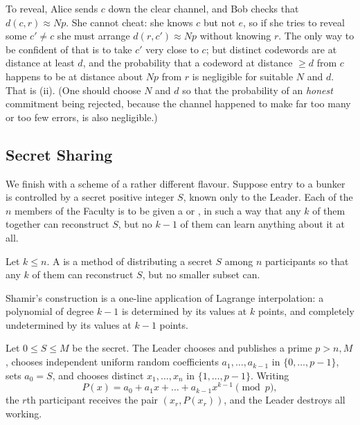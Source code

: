 To reveal, Alice sends $c$ down the clear channel, and Bob checks that $d(c,r)\approx Np$. She cannot cheat: she knows $c$ but not $e$, so if she tries to reveal some $c'\ne c$ she must arrange $d(r,c')\approx Np$ without knowing $r$. The only way to be confident of that is to take $c'$ very close to $c$; but distinct codewords are at distance at least $d$, and the probability that a codeword at distance $\ge d$ from $c$ happens to be at distance about $Np$ from $r$ is negligible for suitable $N$ and $d$. That is (ii). (One should choose $N$ and $d$ so that the probability of an \emph{honest} commitment being rejected, because the channel happened to make far too many or too few errors, is also negligible.)

\subsection{Secret Sharing}

We finish with a scheme of a rather different flavour. Suppose entry to a bunker is controlled by a secret positive integer $S$, known only to the Leader. Each of the $n$ members of the Faculty is to be given a  or , in such a way that any $k$ of them together can reconstruct $S$, but no $k-1$ of them can learn anything about it at all.

\begin{definition}
	Let $k \le n$. A  is a method of distributing a secret $S$ among $n$ participants so that any $k$ of them can reconstruct $S$, but no smaller subset can.
\end{definition}

Shamir's construction is a one-line application of Lagrange interpolation: a polynomial of degree $k-1$ is determined by its values at $k$ points, and completely undetermined by its values at $k-1$ points.

Let $0 \le S \le M$ be the secret. The Leader chooses and publishes a prime $p > n, M$, chooses independent uniform random coefficients $a_1,\dots,a_{k-1}$ in $\{0,\dots,p-1\}$, sets $a_0 = S$, and chooses distinct $x_1,\dots,x_n$ in $\{1,\dots,p-1\}$. Writing
$$P(x) = a_0+a_1x+\dots+a_{k-1}x^{k-1} \pmod p,$$
the $r$th participant receives the pair $(x_r, P(x_r))$, and the Leader destroys all working.

